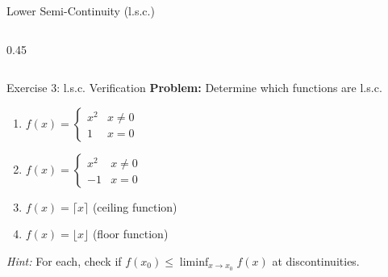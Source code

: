 \documentclass[aspectratio=169]{beamer}
\begin{document}
\begin{frame}{Lower Semi-Continuity (l.s.c.)}
\begin{columns}
\begin{column}{0.45\textwidth}
\begin{center}
\end{center}
\end{column}
\end{columns}
\end{frame}

\begin{frame}{Exercise 3: l.s.c. Verification}
\textbf{Problem:} Determine which functions are l.s.c.

\vspace{0.3cm}
\begin{enumerate}
    \item[(a)] $f(x) = \begin{cases} x^2 & x \neq 0 \\ 1 & x = 0 \end{cases}$

    \vspace{0.2cm}
    \item[(b)] $f(x) = \begin{cases} x^2 & x \neq 0 \\ -1 & x = 0 \end{cases}$

    \vspace{0.2cm}
    \item[(c)] $f(x) = \lceil x \rceil$ (ceiling function)

    \vspace{0.2cm}
    \item[(d)] $f(x) = \lfloor x \rfloor$ (floor function)
\end{enumerate}

\vspace{0.3cm}
\textit{Hint:} For each, check if $f(x_0) \leq \liminf_{x \to x_0} f(x)$ at discontinuities.
\end{frame}
\end{document}
